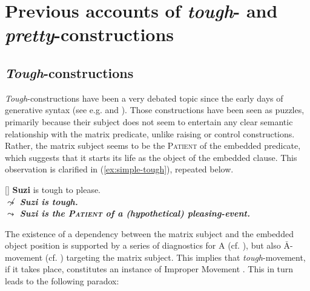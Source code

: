 \documentclass[11pt]{article}
\newcommand{\Abar}{$\bar{\text{A}}$}
\begin{document}
\section{Previous accounts of \textit{tough}- and \textit{pretty}-constructions}\label{sec:previous-aproaches}
\subsection{\textit{Tough}-constructions}\label{app:2-camps}
\textit{Tough}-constructions have been a very debated topic since the early days of generative syntax (see e.g. \cite{Chomsky1964} and \cite{Rosenbaum1967}). Those constructions have been seen as puzzles, primarily because their subject does not seem to entertain any clear semantic relationship with the matrix predicate, unlike raising or control constructions. Rather, the matrix subject seems to be the \textsc{Patient} of the embedded predicate, which suggests that it starts its life as the object of the embedded clause. This observation is clarified in (\ref{ex:simple-tough}), repeated below.
\begin{exe}
	 {\textbf{Suzi} is tough to please.\\ \textbf{\textit{$\not \leadsto$ Suzi is tough.}\\ \textbf{\textit{$ \leadsto$ Suzi is the \textsc{Patient} of a (hypothetical) pleasing-event.}} } }
\end{exe}
The existence of a dependency between the matrix subject and the embedded object position is supported by a series of diagnostics for A (cf. \cite{Lasnik1991,Mulder1992,Ruys2000}), but also \Abar-movement (cf. \cite{Chomsky1977,Chomsky1982,Rezac2006}) targeting the matrix subject. This implies that \textit{tough}-movement, if it takes place, constitutes an instance of Improper Movement \cite{Chomsky1986}. This in turn leads to the following paradox:

\begin{center}
\end{center}
\end{document}
